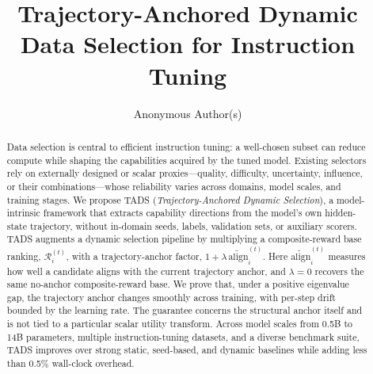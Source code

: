 \documentclass[sigconf,anonymous,review]{acmart}
\begin{document}
\title{Trajectory-Anchored Dynamic Data Selection for
       Instruction Tuning}

\author{Anonymous Author(s)}

\begin{abstract}
Data selection is central to efficient instruction tuning: a
well-chosen subset can reduce compute while shaping the capabilities
acquired by the tuned model. Existing selectors rely on externally
designed or scalar proxies---quality, difficulty, uncertainty,
influence, or their combinations---whose reliability varies across
domains, model scales, and training stages. We propose \textsc{TADS}
(\textit{Trajectory-Anchored Dynamic Selection}), a model-intrinsic
framework that extracts capability directions from the model's own
hidden-state trajectory, without in-domain seeds, labels, validation
sets, or auxiliary scorers. \textsc{TADS} augments a dynamic
selection pipeline by multiplying a composite-reward base
ranking, $\mathcal{R}_i^{(t)}$, with a trajectory-anchor
factor, $1+\lambda\,\widetilde{\mathrm{align}}_i^{(t)}$. Here
$\widetilde{\mathrm{align}}_i^{(t)}$ measures how well a candidate
aligns with the current trajectory anchor, and $\lambda=0$ recovers
the same no-anchor composite-reward base. We prove that, under a
positive eigenvalue gap, the trajectory anchor changes smoothly
across training, with per-step drift bounded by the learning rate.
The guarantee concerns the structural anchor itself and is not tied
to a particular scalar utility transform. Across model scales
from 0.5B to 14B parameters, multiple instruction-tuning datasets,
and a diverse benchmark suite, \textsc{TADS} improves over strong
static, seed-based, and dynamic baselines while adding less than
0.5\% wall-clock overhead.
\end{abstract}




\maketitle








\end{document}
